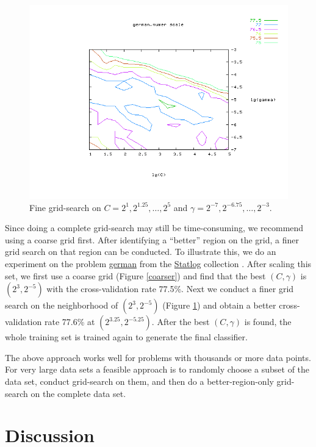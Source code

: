 \documentclass[12pt]{article}
\begin{document}
\begin{figure}[t!]
\begin{center}
\includegraphics[width=0.75\linewidth,viewport=145 55 625 450,clip]{finer.png}
\end{center}
\caption{Fine grid-search on $C=2^{1},2^{1.25},\ldots,2^{5}$ and 
$\gamma=2^{-7},2^{-6.75},\ldots,2^{-3}.$}
\label{finer}
\end{figure}

Since doing a complete grid-search may still be time-consuming, we
recommend using a coarse grid first.  After identifying a ``better''
region on the grid, a finer grid search on that region can be
conducted. To illustrate this, we do an experiment on the problem
\href{http://www.csie.ntu.edu.tw/~cjlin/libsvmtools/binary/german.numer_scale}{{\sf
    german}} from the
\href{http://www.ncc.up.pt/liacc/ML/statlog/datasets.html}{Statlog}
collection \citep{DM94a}. After scaling this set, we first use a
coarse grid (Figure \ref{coarser}) and find that the best $(C,
\gamma)$ is $(2^3, 2^{-5})$ with the cross-validation rate 77.5\%.
Next we conduct a finer grid search on the neighborhood of $(2^3,
2^{-5})$ (Figure \ref{finer}) and obtain a better cross-validation
rate 77.6\% at $(2^{3.25}, 2^{-5.25})$. After the best $(C, \gamma)$
is found, the whole training set is trained again to generate the
final classifier.

The above approach works well for problems with thousands or more data
points. For very large data sets a feasible approach is to randomly
choose a subset of the data set, conduct grid-search on them, and then
do a better-region-only grid-search on the complete data set.

\section{Discussion}
\end{document}
